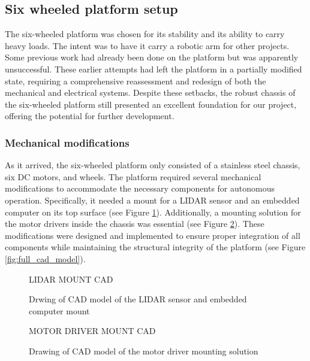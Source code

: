 \documentclass[11pt]{article}
\begin{document}
    \subsection{Six wheeled platform setup}

        The six-wheeled platform was chosen for its stability and its ability to carry heavy loads. The intent was to have it carry a robotic arm for other projects. Some previous work had already been done on the platform but was apparently unsuccessful. These earlier attempts had left the platform in a partially modified state, requiring a comprehensive reassessment and redesign of both the mechanical and electrical systems. Despite these setbacks, the robust chassis of the six-wheeled platform still presented an excellent foundation for our project, offering the potential for further development.

        \subsubsection{Mechanical modifications}
        As it arrived, the six-wheeled platform only consisted of a stainless steel chassis, six DC motors, and wheels. The platform required several mechanical modifications to accommodate the necessary components for autonomous operation. Specifically, it needed a mount for a LIDAR sensor and an embedded computer on its top surface (see Figure \ref{fig:LIDAR_mount}). Additionally, a mounting solution for the motor drivers inside the chassis was essential (see Figure \ref{fig:motor_driver_mount}). These modifications were designed and implemented to ensure proper integration of all components while maintaining the structural integrity of the platform (see Figure \ref{fig:full_cad_model}).

        \begin{figure}[htbp]
            \centering
            LIDAR MOUNT CAD
            \caption{Drwing of CAD model of the LIDAR sensor and embedded computer mount}
            \label{fig:LIDAR_mount}
        \end{figure}
        
        \begin{figure}[htbp]
            \centering
            MOTOR DRIVER MOUNT CAD
            \caption{Drawing of CAD model of the motor driver mounting solution}
            \label{fig:motor_driver_mount}
        \end{figure}
        
\end{document}
